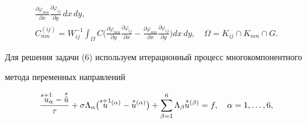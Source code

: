 \begin{gather*}
\frac{\partial\varphi_{mn}}{\partial x}\frac{\partial\varphi_{ij}}{


\partial y}\,dx\,dy, \\


%


C_{mn}^{(ij)}=W_{ij}^{-1}\int_{\Omega}C\biggl(\frac{\partial\varphi_{mn}}{


\partial y}\frac{\partial\varphi_{ij}}{\partial x}-


\frac{\partial\varphi_{mn}}{\partial x}\frac{\partial\varphi_{ij}}{


\partial y}\biggr)dx\,dy,\quad


\Omega=K_{ij}\cap K_{mn}\cap G.


\end{gather*}





Для решения задачи (6) используем итерационный процесс многокомпонентного


метода переменных направлений


\begin{equation}


\frac{\overset{s+1}{u}_{\!\!\!\alpha}-\overset{s}{\tilde u}}{\tau}


+\sigma\Lambda_\alpha\bigl(\ussa-\usva\bigr)+\sum_{\beta=1}^6


\Lambda_\beta\usvb=f,\quad \alpha=1,\dotsc,6,


\end{equation}


